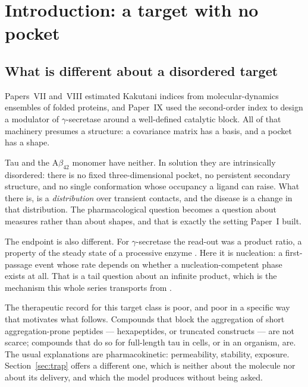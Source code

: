 \documentclass[11pt,reqno]{amsart}
\theoremstyle{plain}
\theoremstyle{definition}
\theoremstyle{remark}
\numberwithin{equation}{section}
\newcommand{\Ab}{\mathrm{A}\beta}
\begin{document}
\maketitle
\enlargethispage{\baselineskip}
\tableofcontents

\section{Introduction: a target with no pocket}
\label{sec:intro}

\subsection{What is different about a disordered target}
Papers~VII and~VIII estimated Kakutani indices from molecular-dynamics ensembles of folded proteins, and Paper~IX used the second-order index to design a modulator of $\gamma$-secretase around a well-defined catalytic block. All of that machinery presumes a structure: a covariance matrix has a basis, and a pocket has a shape.

Tau and the $\Ab_{42}$ monomer have neither. In solution they are intrinsically disordered: there is no fixed three-dimensional pocket, no persistent secondary structure, and no single conformation whose occupancy a ligand can raise. What there is, is a \emph{distribution} over transient contacts, and the disease is a change in that distribution. The pharmacological question becomes a question about measures rather than about shapes, and that is exactly the setting Paper~I built.

The endpoint is also different. For $\gamma$-secretase the read-out was a product ratio, a property of the steady state of a processive enzyme \cite{Takami2009}. Here it is nucleation: a first-passage event whose rate depends on whether a nucleation-competent phase exists at all. That is a tail question about an infinite product, which is the mechanism this whole series transports from \cite{Chen2026}.

The therapeutic record for this target class is poor, and poor in a specific way that motivates what follows. Compounds that block the aggregation of short aggregation-prone peptides --- hexapeptides, or truncated constructs --- are not scarce; compounds that do so for full-length tau in cells, or in an organism, are. The usual explanations are pharmacokinetic: permeability, stability, exposure. Section~\ref{sec:trap} offers a different one, which is neither about the molecule nor about its delivery, and which the model produces without being asked.
\end{document}
